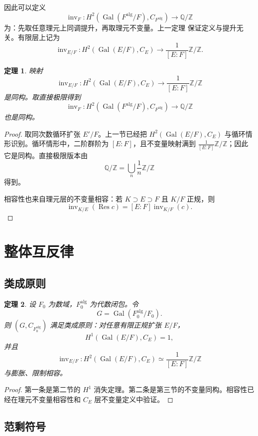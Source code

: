 \documentclass[11pt,a4paper,openany]{ctexbook}
\numberwithin{equation}{chapter}
\newcommand{\Q}{\mathbb{Q}}
\newcommand{\Z}{\mathbb{Z}}
\newcommand{\Gal}{\operatorname{Gal}}
\theoremstyle{plain}
\newtheorem{theorem}{定理}[chapter]
\theoremstyle{definition}
\theoremstyle{remark}
\begin{document}
因此可以定义
\[
\operatorname{inv}_F:H^2(\Gal(F^{\mathrm{alg}}/F),C_{F^{\mathrm{alg}}})\to\Q/\Z
\]
为：先取任意理元上同调提升，再取理元不变量。上一定理 保证定义与提升无关。有限层上记为
\[
\operatorname{inv}_{E/F}:H^2(\Gal(E/F),C_E)\to\frac1{[E:F]}\Z/\Z.
\]

\begin{theorem}
映射
\[
\operatorname{inv}_{E/F}:H^2(\Gal(E/F),C_E)\longrightarrow \frac1{[E:F]}\Z/\Z
\]
是同构。取直接极限得到
\[
\operatorname{inv}_F:H^2(\Gal(F^{\mathrm{alg}}/F),C_{F^{\mathrm{alg}}})\longrightarrow \Q/\Z
\]
也是同构。
\end{theorem}

\begin{proof}
取同次数循环扩张 $E'/F$。上一节已经把 $H^2(\Gal(E/F),C_E)$ 与循环情形识别。循环情形中，二阶群阶为 $[E:F]$，且不变量映射满到 $\frac1{[E:F]}\Z/\Z$；因此它是同构。直接极限版本由
\[
\Q/\Z=\bigcup_n\frac1n\Z/\Z
\]
得到。

相容性也来自理元层的不变量相容：若 $K\supset E\supset F$ 且 $K/F$ 正规，则
\[
\operatorname{inv}_{K/E}(\operatorname{Res}c)=[E:F]\operatorname{inv}_{K/F}(c).
\]
\end{proof}

\section{整体互反律}

\subsection{类成原则}

\begin{theorem}
设 $F_0$ 为数域，$F_0^{\mathrm{alg}}$ 为代数闭包。令
\[
G=\Gal(F_0^{\mathrm{alg}}/F_0).
\]
则 $(G,C_{F_0^{\mathrm{alg}}})$ 满足类成原则：对任意有限正规扩张 $E/F$，
\[
H^1(\Gal(E/F),C_E)=1,
\]
并且
\[
\operatorname{inv}_{E/F}:H^2(\Gal(E/F),C_E)\simeq \frac1{[E:F]}\Z/\Z
\]
与膨胀、限制相容。
\end{theorem}

\begin{proof}
第一条是第二节的 $H^1$ 消失定理。第二条是第三节的不变量同构。相容性已经在理元不变量相容性和 $C_E$ 层不变量定义中验证。
\end{proof}

\subsection{范剩符号}
\end{document}
